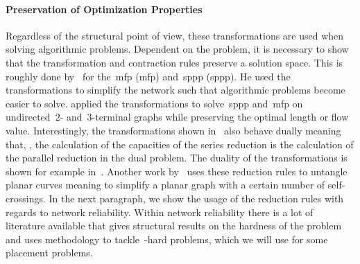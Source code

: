 \paragraph{Preservation of Optimization Properties}
% 
Regardless of the structural point of view, these transformations are used when
solving algorithmic problems. 
% 
Dependent on the problem, it is necessary to show that the transformation and
contraction rules preserve a solution space. This is roughly done
by~\textcite{Ake60} for the~\acrlong{mfp} (\gls{mfp}) and~\acrlong{sppp}
(\gls{sppp}).
% 
He used the transformations to simplify the network such that algorithmic
problems become easier to solve. \textcite{Ake60} applied the transformations to
solve~\gls{sppp} and~\gls{mfp} on undirected~$2$- and~$3$-terminal graphs while
preserving the optimal length or flow value. Interestingly, the transformations
shown in~\textcite{Ake60} also behave dually meaning that, \eg, the calculation
of the capacities of the series reduction is the calculation of the parallel
reduction in the dual problem. The duality of the transformations is shown
for example in~\textcite{Ake60}. Another work by~\textcite{Cha17} uses these
reduction rules to untangle planar curves meaning to simplify a planar graph
with a certain number of self-crossings. In the next paragraph, we show the
usage of the reduction rules with regards to network reliability. Within network
reliability there is a lot of literature available that gives structural results
on the hardness of the problem and uses methodology to tackle~\NP-hard problems,
which we will use for some placement problems.
% 
